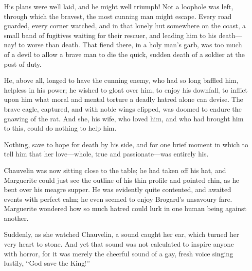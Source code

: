His plans were well laid, and he might well triumph! Not a loophole was left, through which the bravest, the most cunning man might escape. Every road guarded, every corner watched, and in that lonely hut somewhere on the coast, a small band of fugitives waiting for their rescuer, and leading him to his death---nay! to worse than death. That fiend there, in a holy man's garb, was too much of a devil to allow a brave man to die the quick, sudden death of a soldier at the post of duty.

He, above all, longed to have the cunning enemy, who had so long baffled him, helpless in his power; he wished to gloat over him, to enjoy his downfall, to inflict upon him what moral and mental torture a deadly hatred alone can devise. The brave eagle, captured, and with noble wings clipped, was doomed to endure the gnawing of the rat. And she, his wife, who loved him, and who had brought him to this, could do nothing to help him.

Nothing, save to hope for death by his side, and for one brief moment in which to tell him that her love---whole, true and passionate---was entirely his.

Chauvelin was now sitting close to the table; he had taken off his hat, and Marguerite could just see the outline of his thin profile and pointed chin, as he bent over his meagre supper. He was evidently quite contented, and awaited events with perfect calm; he even seemed to enjoy Brogard's unsavoury fare. Marguerite wondered how so much hatred could lurk in one human being against another.

Suddenly, as she watched Chauvelin, a sound caught her ear, which turned her very heart to stone. And yet that sound was not calculated to inspire anyone with horror, for it was merely the cheerful sound of a gay, fresh voice singing lustily, \enquote{God save the King!}
